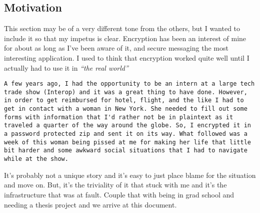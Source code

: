 \subsection{Motivation}
This section may be of a very different tone from the others, but I wanted to include it so that my impetus is clear. Encryption has been an interest of mine for about as long as I've been aware of it, and secure messaging the most interesting application. I used to think that encryption worked quite well until I actually had to use it in \textit{``the real world''}
\begin{lstlisting}
A few years ago, I had the opportunity to be an intern at a large tech trade show (Interop) and it was a great thing to have done. However, in order to get reimbursed for hotel, flight, and the like I had to get in contact with a woman in New York. She needed to fill out some forms with information that I'd rather not be in plaintext as it traveled a quarter of the way around the globe. So, I encrypted it in a password protected zip and sent it on its way. What followed was a week of this woman being pissed at me for making her life that little bit harder and some awkward social situations that I had to navigate while at the show.
\end{lstlisting}
It's probably not a unique story and it's easy to just place blame for the situation and move on. But, it's the triviality of it that stuck with me and it's the infrastructure that was at fault. Couple that with being in grad school and needing a thesis project and we arrive at this document.
